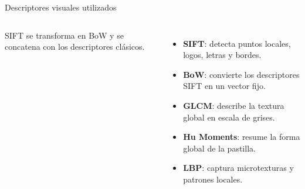 \documentclass[aspectratio=169,11pt]{beamer}
\begin{document}
\begin{frame}{Descriptores visuales utilizados}
\begin{columns}[T,onlytextwidth]
  {\scriptsize
  SIFT se transforma en BoW y se concatena con los descriptores clásicos.
  }

  \vspace{0pt}

  {\footnotesize
  \begin{itemize}
    \setlength\itemsep{0.10cm}
    \item \textbf{SIFT}: detecta puntos locales, logos, letras y bordes.
    \item \textbf{BoW}: convierte los descriptores SIFT en un vector fijo.
    \item \textbf{GLCM}: describe la textura global en escala de grises.
    \item \textbf{Hu Moments}: resume la forma global de la pastilla.
    \item \textbf{LBP}: captura microtexturas y patrones locales.
  \end{itemize}
  }

\end{columns}
\end{frame}
\end{document}
